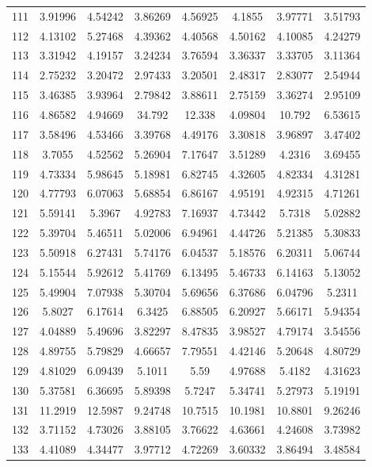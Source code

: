 \begin{center}
\begin{longtable}{cccccccc}
111 & 3.91996 & 4.54242 & 3.86269 & 4.56925 & 4.1855 & 3.97771 & 3.51793\\
112 & 4.13102 & 5.27468 & 4.39362 & 4.40568 & 4.50162 & 4.10085 & 4.24279\\
113 & 3.31942 & 4.19157 & 3.24234 & 3.76594 & 3.36337 & 3.33705 & 3.11364\\
114 & 2.75232 & 3.20472 & 2.97433 & 3.20501 & 2.48317 & 2.83077 & 2.54944\\
115 & 3.46385 & 3.93964 & 2.79842 & 3.88611 & 2.75159 & 3.36274 & 2.95109\\
116 & 4.86582 & 4.94669 & 34.792 & 12.338 & 4.09804 & 10.792 & 6.53615\\
117 & 3.58496 & 4.53466 & 3.39768 & 4.49176 & 3.30818 & 3.96897 & 3.47402\\
118 & 3.7055 & 4.52562 & 5.26904 & 7.17647 & 3.51289 & 4.2316 & 3.69455\\
119 & 4.73334 & 5.98645 & 5.18981 & 6.82745 & 4.32605 & 4.82334 & 4.31281\\
120 & 4.77793 & 6.07063 & 5.68854 & 6.86167 & 4.95191 & 4.92315 & 4.71261\\
121 & 5.59141 & 5.3967 & 4.92783 & 7.16937 & 4.73442 & 5.7318 & 5.02882\\
122 & 5.39704 & 5.46511 & 5.02006 & 6.94961 & 4.44726 & 5.21385 & 5.30833\\
123 & 5.50918 & 6.27431 & 5.74176 & 6.04537 & 5.18576 & 6.20311 & 5.06744\\
124 & 5.15544 & 5.92612 & 5.41769 & 6.13495 & 5.46733 & 6.14163 & 5.13052\\
125 & 5.49904 & 7.07938 & 5.30704 & 5.69656 & 6.37686 & 6.04796 & 5.2311\\
126 & 5.8027 & 6.17614 & 6.3425 & 6.88505 & 6.20927 & 5.66171 & 5.94354\\
127 & 4.04889 & 5.49696 & 3.82297 & 8.47835 & 3.98527 & 4.79174 & 3.54556\\
128 & 4.89755 & 5.79829 & 4.66657 & 7.79551 & 4.42146 & 5.20648 & 4.80729\\
129 & 4.81029 & 6.09439 & 5.1011 & 5.59 & 4.97688 & 5.4182 & 4.31623\\
130 & 5.37581 & 6.36695 & 5.89398 & 5.7247 & 5.34741 & 5.27973 & 5.19191\\
131 & 11.2919 & 12.5987 & 9.24748 & 10.7515 & 10.1981 & 10.8801 & 9.26246\\
132 & 3.71152 & 4.73026 & 3.88105 & 3.76622 & 4.63661 & 4.24608 & 3.73982\\
133 & 4.41089 & 4.34477 & 3.97712 & 4.72269 & 3.60332 & 3.86494 & 3.48584\\

\end{longtable}
\end{center}
